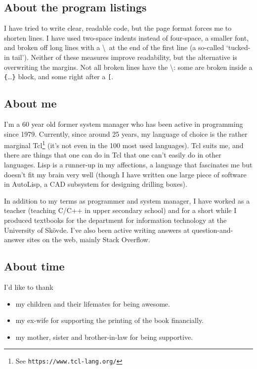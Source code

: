 \documentclass[twoside,9pt]{report}
\begin{document}
\subsection{About the program listings}
\label{about-the-program-listings}

I have tried to write clear, readable code, but the page format forces me to
shorten lines. I have used two-space indents instead of four-space, a smaller
font, and broken off long lines with a \textbackslash\  at the end of the first
line (a so-called `tucked-in tail'). Neither of these measures improve
readability, but the alternative is overwriting the margins. Not all broken
lines have the \textbackslash: some are broken inside a
\texttt{\{}\ldots\texttt{\}} block, and some right after a \texttt{^^5b}.

\subsection{About me}
\label{about-me}

I'm a 60 year old former system manager who has been active in programming
since 1979. Currently, since around 25 years, my language of choice is the
rather marginal Tcl\footnote{See \texttt{https://www.tcl-lang.org/}} (it's not
even in the 100 most used languages). Tcl suits me, and there are things that
one can do in Tcl that one can't easily do in other languages. Lisp is a
runner-up in my affections, a language that fascinates me but doesn't fit my
brain very well (though I have written one large piece of software in AutoLisp,
a CAD subsystem for designing drilling boxes).

In addition to my terms as programmer and system manager, I have worked as a
teacher (teaching C/C++ in upper secondary school) and for a short while I
produced textbooks for the department for information technology at
the University of Skövde. I've also been active writing answers at
question-and-answer sites on the web, mainly Stack Overflow.

\subsection{About time}
\label{about-time}

I'd like to thank

\begin{itemize}
\item my children and their lifemates for being awesome.

\item my ex-wife for supporting the printing of the book financially.

\item my mother, sister and brother-in-law for being supportive.
\end{itemize}
\end{document}
